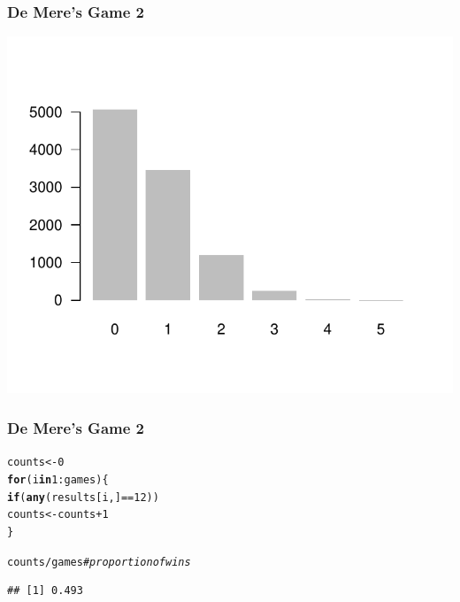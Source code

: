\documentclass[12pt]{beamer}\usepackage[]{graphicx}\usepackage[]{color}
\makeatletter
\newcommand{\hlnum}[1]{\textcolor[rgb]{0.686,0.059,0.569}{#1}}%
\newcommand{\hlcom}[1]{\textcolor[rgb]{0.678,0.584,0.686}{\textit{#1}}}%
\newcommand{\hlopt}[1]{\textcolor[rgb]{0,0,0}{#1}}%
\newcommand{\hlstd}[1]{\textcolor[rgb]{0.345,0.345,0.345}{#1}}%
\newcommand{\hlkwa}[1]{\textcolor[rgb]{0.161,0.373,0.58}{\textbf{#1}}}%
\newcommand{\hlkwb}[1]{\textcolor[rgb]{0.69,0.353,0.396}{#1}}%
\newcommand{\hlkwd}[1]{\textcolor[rgb]{0.737,0.353,0.396}{\textbf{#1}}}%
\newenvironment{kframe}{%
 \def\at@end@of@kframe{}%
 \ifinner\ifhmode%
  \def\at@end@of@kframe{\end{minipage}}%
  \begin{minipage}{\columnwidth}%
 \fi\fi%
 \def\FrameCommand##1{\hskip\@totalleftmargin \hskip-\fboxsep
 \colorbox{shadecolor}{##1}\hskip-\fboxsep
     \hskip-\linewidth \hskip-\@totalleftmargin \hskip\columnwidth}%
 \MakeFramed {\advance\hsize-\width
   \@totalleftmargin\z@ \linewidth\hsize
   \@setminipage}}%
 {\par\unskip\endMakeFramed%
 \at@end@of@kframe}
\newenvironment{knitrout}{}{} %
\makeatother
\begin{document}
\begin{frame}[fragile]
\frametitle{De Mere's Game 2}

\begin{knitrout}\footnotesize
{}\color{fgcolor}

{\centering \includegraphics[width=.7\linewidth,height=.6\linewidth]{figure/unnamed-chunk-61-1} 

}



\end{knitrout}

\end{frame}


\begin{frame}[fragile]
\frametitle{De Mere's Game 2}

\begin{knitrout}\footnotesize
{}\color{fgcolor}\begin{kframe}
\begin{alltt}
\hlstd{counts} \hlkwb{<-} \hlnum{0}
\hlkwa{for} \hlstd{(i} \hlkwa{in} \hlnum{1}\hlopt{:}\hlstd{games) \{}
  \hlkwa{if} \hlstd{(}\hlkwd{any}\hlstd{(results[i, ]} \hlopt{==} \hlnum{12}\hlstd{))}
    \hlstd{counts} \hlkwb{<-} \hlstd{counts} \hlopt{+} \hlnum{1}
\hlstd{\}}

\hlstd{counts} \hlopt{/} \hlstd{games}  \hlcom{# proportion of wins}
\end{alltt}
\begin{verbatim}
## [1] 0.493
\end{verbatim}
\end{kframe}
\end{knitrout}

\end{frame}

\end{document}
